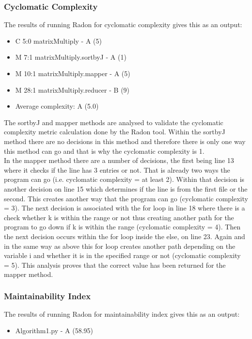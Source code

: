 \documentclass[10.5pt,journal, a4paper]{IEEEtran}
\begin{document}
\subsubsection{Cyclomatic Complexity}
\noindent
The results of running Radon for cyclomatic complexity gives this as an output:
\begin{itemize}
\item C 5:0 matrixMultiply - A (5)
\item M 7:1 matrixMultiply.sortbyJ - A (1)
\item M 10:1 matrixMultiply.mapper - A (5)
\item M 28:1 matrixMultiply.reducer - B (9)
\item Average complexity: A (5.0)
\end{itemize}

\noindent 
The sortbyJ and mapper methods are analysed to validate the cyclomatic complexity metric calculation done by the Radon tool. Within the sortbyJ method there are no decisions in this method and therefore there is only one way this method can go and that is why the cyclomatic complexity is 1. \\

\noindent 
In the mapper method there are a number of decisions, the first being line 13 where it checks if the line has 3 entries or not. That is already two ways the program can go (i.e. cyclomatic complexity = at least 2). Within that decision is another decision on line 15 which determines if the line is from the first file or the second. This creates another way that the program can go (cyclomatic complexity = 3). The next decision is associated with the for loop in line 18 where there is a check whether k is within the range or not thus creating another path for the program to go down if k is within the range (cyclomatic complexity = 4). Then the next decision occurs within the for loop inside the else, on line 23. Again and in the same way as above this for loop creates another path depending on the variable i and whether it is in the specified range or not (cyclomatic complexity = 5). This analysis proves that the correct value has been returned for the mapper method. 



\subsubsection{Maintainability Index}
\noindent
The results of running Radon for maintainability index gives this as an output:
\begin{itemize}
\item Algorithm1.py - A (58.95)
\end{itemize}
\end{document}
